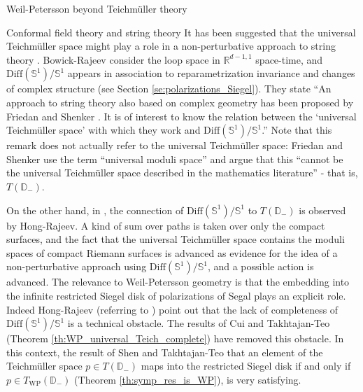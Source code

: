 \documentclass[12pt]{amsart}
\newcommand{\disk}{\ensuremath{\mathbb{D}} } %
\theoremstyle{plain}
\theoremstyle{definition}
\theoremstyle{remark}
\numberwithin{equation}{section} %
\numberwithin{figure}{section} %
\begin{document}
\begin{section}{Weil-Petersson beyond Teichm\"uller theory}
\begin{subsection}{Conformal field theory and string theory}
  It has been suggested that the universal Teichm\"uller space might play a role in a non-perturbative approach to string theory \cite{BowickRajeev,BowickRajeev_short,HongRajeev,Pekonen}.  Bowick-Rajeev \cite{BowickRajeev_short} consider the loop space in $\mathbb{R}^{d-1,1}$ space-time, and $\mathrm{Diff}(\mathbb{S}^1)/\mathbb{S}^1$ appears in association to reparametrization invariance and changes of complex structure (see Section \ref{se:polarizations_Siegel}). They state ``An approach
to string theory also based on complex geometry has
been proposed by Friedan and Shenker \cite{FriedanShenker}. 
It is of interest to know the relation between the `universal
Teichm\"uller space' with which they work and $\text{Diff}(\mathbb{S}^1)/\mathbb{S}^1$.''  Note that this remark does not actually refer to the universal Teichm\"uller space: Friedan and Shenker use the term ``universal moduli space'' and argue that this ``cannot be the universal Teichm\"uller space described in the mathematics literature'' - that is, $T(\disk_-)$.   

On the other hand, in \cite{HongRajeev}, the connection of $\text{Diff}(\mathbb{S}^1)/\mathbb{S}^1$ to $T(\disk_-)$ is observed by Hong-Rajeev. A kind of sum over paths is taken over only the compact surfaces, and the fact that the universal Teichm\"uller space contains the moduli spaces of compact Riemann surfaces is advanced as evidence for the idea of a non-perturbative approach using $\text{Diff}(\mathbb{S}^1)/\mathbb{S}^1$, and a possible action is advanced. The relevance to Weil-Petersson geometry is that the embedding into the infinite restricted Siegel disk of polarizations of Segal plays an explicit role.  Indeed Hong-Rajeev (referring to \cite{NagVerjovsky}) point out that the lack of completeness of $\mathrm{Diff}(\mathbb{S}^1)/\mathbb{S}^1$ is a technical obstacle. The results of Cui and Takhtajan{-Teo}  
(Theorem \ref{th:WP_universal_Teich_complete}) have removed this obstacle. In this context, the result of Shen and Takhtajan-Teo that an element of the Teichm\"uller space $p \in T(\disk_-)$ maps into the restricted Siegel disk if and only if $p \in T_{\mathrm{WP}}(\disk_-)$ (Theorem \ref{th:symp_res_is_WP}), is very satisfying. 


\end{subsection}
\end{section}
\end{document}
